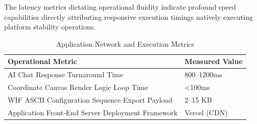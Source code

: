 The latency metrics dictating operational fluidity indicate profound speed capabilities directly attributing responsive execution timings natively executing platform stability operations.

\begin{table}[H]
\centering
\caption{Application Network and Execution Metrics}
\begin{tabular}{|l|l|}
\hline
\textbf{Operational Metric} & \textbf{Measured Value} \\
\hline
AI Chat Response Turnaround Time & 800–1200ms \\
\hline
Coordinate Canvas Render Logic Loop Time & <100ms \\
\hline
WIF ASCII Configuration Sequence Export Payload & 2–15 KB \\
\hline
Application Front-End Server Deployment Framework & Vercel (CDN) \\
\hline
\end{tabular}
\label{tab:api_performance}
\end{table}
